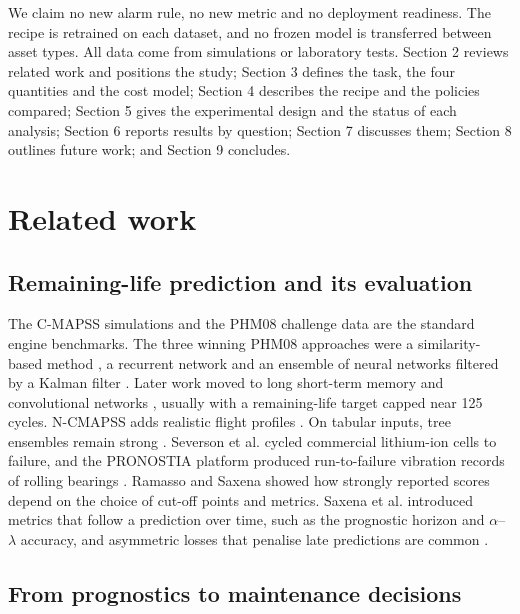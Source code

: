 \documentclass[a4paper,fleqn,doubleblind]{cas-dc}
\begin{document}
We claim no new alarm rule, no new metric and no deployment readiness. The recipe is retrained on each dataset, and no frozen model is transferred between asset types. All data come from simulations or laboratory tests. Section 2 reviews related work and positions the study; Section 3 defines the task, the four quantities and the cost model; Section 4 describes the recipe and the policies compared; Section 5 gives the experimental design and the status of each analysis; Section 6 reports results by question; Section 7 discusses them; Section 8 outlines future work; and Section 9 concludes.

\section{Related work}\label{sec:2}

\subsection{Remaining-life prediction and its evaluation}

The C-MAPSS simulations and the PHM08 challenge data \cite{saxena2008} are the standard engine benchmarks. The three winning PHM08 approaches were a similarity-based method \cite{wang2008}, a recurrent network \cite{heimes2008} and an ensemble of neural networks filtered by a Kalman filter \cite{peel2008}. Later work moved to long short-term memory \cite{zheng2017} and convolutional networks \cite{li2018}, usually with a remaining-life target capped near 125 cycles. N-CMAPSS adds realistic flight profiles \cite{ariaschao2021}. On tabular inputs, tree ensembles remain strong \cite{grinsztajn2022,friedman2001}. Severson et al. \cite{severson2019} cycled commercial lithium-ion cells to failure, and the PRONOSTIA platform produced run-to-failure vibration records of rolling bearings \cite{nectoux2012}. Ramasso and Saxena \cite{ramasso2014} showed how strongly reported scores depend on the choice of cut-off points and metrics. Saxena et al. \cite{saxena2010} introduced metrics that follow a prediction over time, such as the prognostic horizon and $\alpha$--$\lambda$ accuracy, and asymmetric losses that penalise late predictions are common \cite{rengasamy2020}.

\subsection{From prognostics to maintenance decisions}
\end{document}

